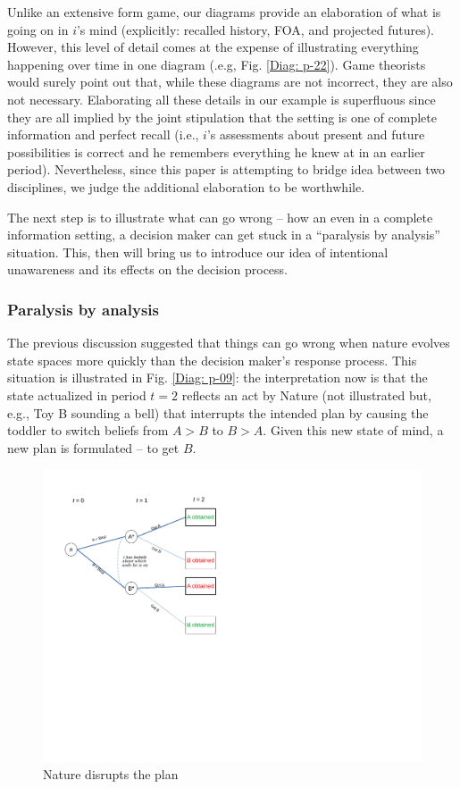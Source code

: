 \documentclass[
11pt,
titlepage,
reqno,
]{article}%
\theoremstyle{definition}
\begin{document}
Unlike an extensive form game, our diagrams provide an elaboration of what is going on in $i$'s mind (explicitly: recalled history, FOA, and projected futures). However, this level of detail comes at the expense of illustrating everything happening over time in one diagram (.e.g,  Fig. \ref{Diag: p-22}). Game theorists would surely point out that, while these diagrams are not incorrect, they are also not necessary. Elaborating all these details in our example is superfluous since they are all implied by the joint stipulation that the setting is one of complete information and perfect recall (i.e., $i$'s assessments about present and future possibilities is correct and he remembers everything he knew at in an earlier period). Nevertheless, since this paper is attempting to bridge idea between two disciplines, we judge the additional elaboration to be worthwhile. 

The next step is to illustrate what can go wrong -- how an even in a complete information setting, a decision maker can get stuck in a ``paralysis by analysis'' situation. This, then will bring us to introduce our idea of intentional unawareness and its  effects on the decision process.

\subsubsection{Paralysis by analysis}
The previous discussion suggested that things can go wrong when nature evolves state spaces more quickly than the decision maker's response process. This situation is illustrated in Fig. \ref{Diag: p-09}: the interpretation now is that the state actualized in period $t=2$ reflects an act by Nature (not illustrated but, e.g., Toy B sounding a bell) that interrupts the intended plan by causing the toddler to switch beliefs from $A>B$ to $B>A$. Given this new state of mind, a new plan is formulated -- to get $B$.

\begin{figure}[h!]
	\centering
	\includegraphics*[page=10,trim = 0 3.5in 0in 0in,scale=.65]{Awareness_Diagrams_All}
	\caption{Nature disrupts the plan\label{Diag: p-10}}%
\end{figure}
\end{document}

